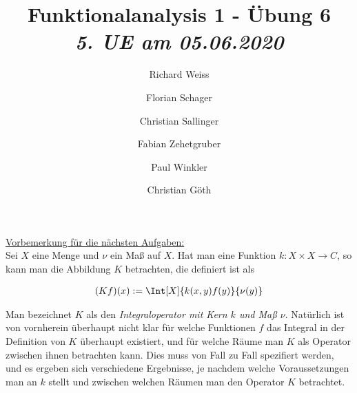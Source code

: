 \documentclass{article}
\title
{
  Funktionalanalysis 1 - Übung 6 \\
  \vspace{4pt}
  \normalsize
  \textit{5. UE am 05.06.2020}
}
\author
{
  Richard Weiss       \and
  Florian Schager     \and
  Christian Sallinger \and
  Fabian Zehetgruber  \and
  Paul Winkler        \and
  Christian Göth
}
\date{}
\begin{document}
\maketitle




\phantom{}

\underline{Vorbemerkung für die nächsten Aufgaben:} \\

Sei $X$ eine Menge und $\nu$ ein Maß auf $X$.
Hat man eine Funktion $k: X \times X \to C$, so kann man die Abbildung $K$ betrachten, die definiert ist als

\begin{align*}
  (K f)(x)
  :=
  \Int[X]{k(x, y) f(y)}{\nu(y)}
\end{align*}

Man bezeichnet $K$ als den \textit{Integraloperator mit Kern $k$ und Maß $\nu$}.
Natürlich ist von vornherein überhaupt nicht klar für welche Funktionen $f$ das Integral in der Definition von $K$ überhaupt existiert, und für welche Räume man $K$ als Operator zwischen ihnen betrachten kann.
Dies muss von Fall zu Fall spezifiert werden, und es ergeben sich verschiedene Ergebnisse, je nachdem welche Voraussetzungen man an $k$ stellt und zwischen welchen Räumen man den Operator $K$ betrachtet.






\end{document}
